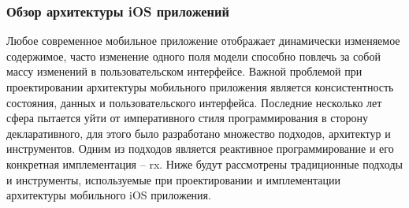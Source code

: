\subsubsection{Обзор архитектуры iOS приложений}
\label{sec:analysis:research:mobArch}

Любое современное мобильное приложение отображает динамически изменяемое содержимое, часто изменение одного поля модели способно повлечь за собой массу изменений в пользовательском интерфейсе. Важной проблемой при проектировании архитектуры мобильного приложения является консистентность состояния, данных и пользовательского интерфейса. Последние несколько лет сфера пытается уйти от императивного стиля программирования в сторону декларативного, для этого было разработано множество подходов, архитектур и инструментов. Одним из подходов является реактивное программирование и его конкретная имплементация -- \gls{rx}. Ниже будут рассмотрены традиционные подходы и инструменты, используемые при проектировании и имплементации архитектуры мобильного iOS приложения.






